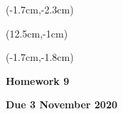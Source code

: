 \documentclass[12pt, oneside]{article}
\begin{document}
\begin{textblock*}{4cm}(-1.7cm,-2.3cm)
\end{textblock*}

\begin{textblock*}{8cm}(12.5cm,-1cm)
\end{textblock*}
\begin{textblock*}{13.5cm}(-1.7cm,-1.8cm)
\end{textblock*}

\vspace{1cm}

\begin{center}
\textbf{\Large Homework 9}

\textbf{Due 3 November 2020}
\end{center}
\end{document}
